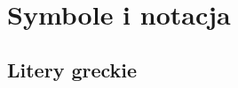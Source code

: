 \documentclass[14pt,a4paper]{extarticle}
\begin{document}

\begin{titlepage} %
\newpage
\
\end{titlepage}

\tableofcontents %

\cleardoublepage
{}




\section{Symbole i notacja}

\begin{multicols}{2}
\renewcommand{\arraystretch}{1.2}
\setlength{\arrayrulewidth}{0.5mm}

\subsection{Litery greckie}
{%

   \setlength\extrarowheight{2.96pt}


}
\end{multicols}
\end{document}
